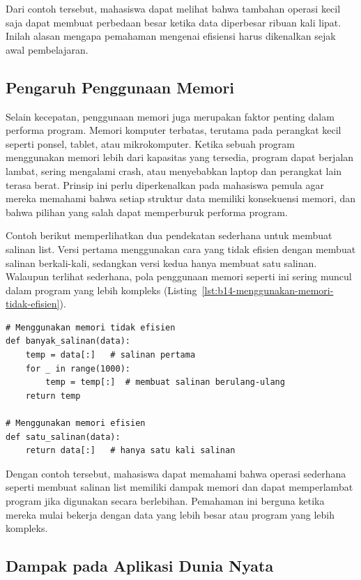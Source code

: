 Dari contoh tersebut, mahasiswa dapat melihat bahwa tambahan operasi kecil saja dapat membuat perbedaan besar ketika data diperbesar ribuan kali lipat. Inilah alasan mengapa pemahaman mengenai efisiensi harus dikenalkan sejak awal pembelajaran.

\subsection{Pengaruh Penggunaan Memori}

Selain kecepatan, penggunaan memori juga merupakan faktor penting dalam performa program. Memori komputer terbatas, terutama pada perangkat kecil seperti ponsel, tablet, atau mikrokomputer. Ketika sebuah program menggunakan memori lebih dari kapasitas yang tersedia, program dapat berjalan lambat, sering mengalami crash, atau menyebabkan laptop dan perangkat lain terasa berat. Prinsip ini perlu diperkenalkan pada mahasiswa pemula agar mereka memahami bahwa setiap struktur data memiliki konsekuensi memori, dan bahwa pilihan yang salah dapat memperburuk performa program.

Contoh berikut memperlihatkan dua pendekatan sederhana untuk membuat salinan list. Versi pertama menggunakan cara yang tidak efisien dengan membuat salinan berkali-kali, sedangkan versi kedua hanya membuat satu salinan. Walaupun terlihat sederhana, pola penggunaan memori seperti ini sering muncul dalam program yang lebih kompleks (Listing~\ref{lst:b14-menggunakan-memori-tidak-efisien}).

\begin{lstlisting}[style=PythonStyle, caption={Menggunakan memori tidak efisien}, label={lst:b14-menggunakan-memori-tidak-efisien}]
# Menggunakan memori tidak efisien
def banyak_salinan(data):
    temp = data[:]   # salinan pertama
    for _ in range(1000):
        temp = temp[:]  # membuat salinan berulang-ulang
    return temp

# Menggunakan memori efisien
def satu_salinan(data):
    return data[:]   # hanya satu kali salinan
\end{lstlisting}

Dengan contoh tersebut, mahasiswa dapat memahami bahwa operasi sederhana seperti membuat salinan list memiliki dampak memori dan dapat memperlambat program jika digunakan secara berlebihan. Pemahaman ini berguna ketika mereka mulai bekerja dengan data yang lebih besar atau program yang lebih kompleks.

\subsection{Dampak pada Aplikasi Dunia Nyata}

